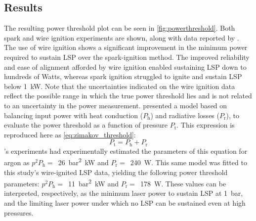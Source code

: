         \subsection{Results}
            The resulting power threshold plot can be seen in \autoref{fig:powerthreshold}. Both spark and wire ignition experiments are shown, along with data reported by \textcite{zimakovInteractionNearIRLaser2016,matsuiGeneratingConditionsArgon2019,luCharacteristicDiagnosticsLaserStabilized2022}. The use of wire ignition shows a significant improvement in the minimum power required to sustain LSP over the spark-ignition method. The improved reliability and ease of alignment afforded by wire ignition enabled sustaining LSP down to hundreds of Watts, whereas spark ignition struggled to ignite and sustain LSP below \qty{1}{kW}. Note that the uncertainties indicated on the wire ignition data reflect the possible range in which the true power threshold lies and is not related to an uncertainty in the power measurement. \textcite{zimakovInteractionNearIRLaser2016} presented a model based on balancing input power with heat conduction ($P_\mathrm{h}$) and radiative losses ($P_\mathrm{r}$), to evaluate the power threshold as a function of pressure $P_\mathrm{t}$. This expression is reproduced here as \autoref{eq:zimakov_threshold}:
            \begin{equation} \label{eq:zimakov_threshold}
                P_\mathrm{t} = P_\mathrm{h} + P_\mathrm{r}
            \end{equation}
            \citeauthor{zimakovInteractionNearIRLaser2016}'s experiments had experimentally estimated the parameters of this equation for argon as $p^2P_\mathrm{h} =$~\qty{26}{bar^2.kW} and $P_\mathrm{r} =$~\qty{240}{W}. This same model was fitted to this study's wire-ignited LSP data, yielding the following power threshold parameters: $p^2P_\mathrm{h} =$~\qty{11}{bar^2.kW} and $P_\mathrm{r} =$~\qty{178}{W}. These values can be interpreted, respectively, as the minimum laser power to sustain LSP at \qty{1}{bar}, and the limiting laser power under which no LSP can be sustained even at high pressures.

